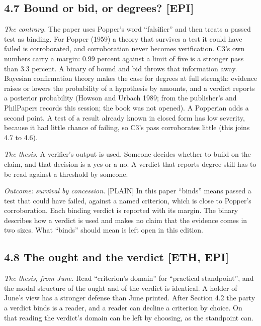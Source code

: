 \documentclass[11pt]{article}
\newcommand{\register}[1]{{\ttfamily\small #1}}
\begin{document}
\subsection*{4.7 Bound or bid, or degrees? [EPI]}

\emph{The contrary.} The paper uses Popper's word ``falsifier'' and then treats a passed test as binding. For Popper (1959) a theory that survives a test it could have failed is corroborated, and corroboration never becomes verification. C3's own numbers carry a margin: 0.99 percent against a limit of five is a stronger pass than 3.3 percent. A binary of bound and bid throws that information away. Bayesian confirmation theory makes the case for degrees at full strength: evidence raises or lowers the probability of a hypothesis by amounts, and a verdict reports a posterior probability (Howson and Urbach 1989; from the publisher's and PhilPapers records this session; the book was not opened). A Popperian adds a second point. A test of a result already known in closed form has low severity, because it had little chance of failing, so C3's pass corroborates little (this joins 4.7 to 4.6).

\emph{The thesis.} A verifier's output is used. Someone decides whether to build on the claim, and that decision is a yes or a no. A verdict that reports degree still has to be read against a threshold by someone.

\emph{Outcome: survival by concession.} \register{[PLAIN]} In this paper ``binds'' means passed a test that could have failed, against a named criterion, which is close to Popper's corroboration. Each binding verdict is reported with its margin. The binary describes how a verdict is used and makes no claim that the evidence comes in two sizes. What ``binds'' should mean is left open in this edition.

\subsection*{4.8 The ought and the verdict [ETH, EPI]}

\emph{The thesis, from June.} Read ``criterion's domain'' for ``practical standpoint'', and the modal structure of the ought and of the verdict is identical. A holder of June's view has a stronger defense than June printed. After Section 4.2 the party a verdict binds is a reader, and a reader can decline a criterion by choice. On that reading the verdict's domain can be left by choosing, as the standpoint can.
\end{document}
